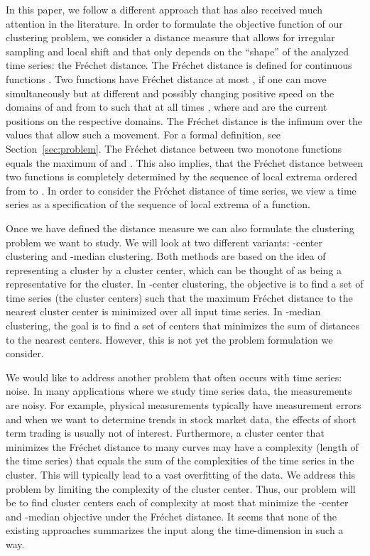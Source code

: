 \documentclass[11pt, letter]{article}
\newcommand{\secref}[1]{Section~\ref{sec:#1}}
\newcommand{\Frechet}{Fr\'echet\xspace}
\begin{document}
In this paper, we follow a different approach that has also received much attention in the literature. In order to formulate the objective function of our clustering problem, we consider a distance measure that allows for irregular sampling and local shift and that only depends on the ``shape'' of the analyzed time series: the \Frechet{} distance.
The \Frechet{} distance is defined for continuous functions .
Two functions  have \Frechet{} distance at most , if one can move simultaneously 
but at different and possibly changing positive speed on the domains of  and  from  to  such 
that at all times , where  and  are the current positions on the respective domains. 
The \Frechet{} distance is the infimum over the values  that allow such a movement. For a formal
definition, see \secref{problem}. The \Frechet{} distance between two monotone
functions  equals the maximum of  and . 
This also implies, that the \Frechet{} distance between two functions is completely 
determined by the sequence of local extrema ordered from  to . 
In order to consider the \Frechet{} distance of time series, we view a time series as a specification of
the sequence of local extrema of a function. 


Once we have defined the distance measure we can also formulate the clustering problem we want to study.
We will look at two different variants: -center clustering and -median clustering. Both methods are
based on the idea of representing a cluster by a cluster center, which can be thought of as being a
representative for the cluster. In -center clustering, the objective is to find a set of  time series (the cluster centers)
such that the maximum \Frechet{} distance to the nearest cluster center is minimized over all input time series.
In -median clustering, the goal is to find a set of  centers that minimizes the sum of distances to 
the nearest centers. However, this is not yet the problem formulation we consider.

We would like to address another problem that often occurs with time series: noise. In many applications where
we study time series data, the measurements are noisy. For example, physical measurements typically have measurement errors
and when we want to determine trends in stock market data, the effects of short term trading is usually not of interest.
Furthermore, a cluster center that minimizes the \Frechet{} distance to many curves may have a complexity (length of the time series)
that equals the sum of the complexities of the time series in the cluster. This will typically lead to a vast overfitting
of the data. We address this problem by limiting the complexity of the cluster center. Thus,
our problem will be to find  cluster centers each of complexity at most  that minimize the -center and
-median objective under the \Frechet{} distance.
It seems that  none of the existing approaches summarizes the
input along the time-dimension in such a way.  
\end{document}
